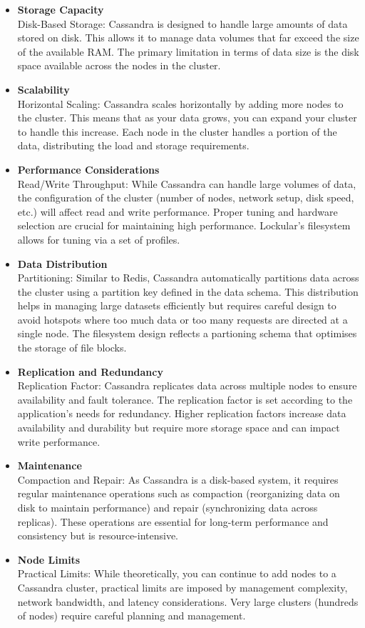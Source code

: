 \documentclass{tufte-handout}
\begin{document}
\begin{itemize}
  \item \textbf{Storage Capacity}\\
Disk-Based Storage: Cassandra is designed to handle large amounts of data stored on disk. This allows it to manage data volumes that far
exceed the size of the available RAM. The primary limitation in terms of data size is the disk space available across the nodes in the
cluster.
\item \textbf{Scalability}\\
Horizontal Scaling: Cassandra scales horizontally by adding more nodes to the cluster. This means that as your data grows, you can expand
your cluster to handle this increase. Each node in the cluster handles a portion of the data, distributing the load and storage requirements.
\item \textbf{Performance Considerations}\\
Read/Write Throughput: While Cassandra can handle large volumes of data, the configuration of the cluster (number of nodes, network setup,
disk speed, etc.) will affect read and write performance. Proper tuning and hardware selection are crucial for maintaining high performance.
Lockular's filesystem allows for tuning via a set of profiles.
\item \textbf{Data Distribution}\\
Partitioning: Similar to Redis, Cassandra automatically partitions data across the cluster using a partition key defined in the data schema. This distribution
helps in managing large datasets efficiently but requires careful design to avoid hotspots where too much data or too many requests are
directed at a single node. The filesystem design reflects a partioning schema that optimises the storage of file blocks.
\item \textbf{Replication and Redundancy}\\
Replication Factor: Cassandra replicates data across multiple nodes to ensure availability and fault tolerance. The replication factor
is set according to the application's needs for redundancy. Higher replication factors increase data availability and durability
but require more storage space and can impact write performance.
\item \textbf{Maintenance}\\
Compaction and Repair: As Cassandra is a disk-based system, it requires regular maintenance operations such as compaction (reorganizing
data on disk to maintain performance) and repair (synchronizing data across replicas). These operations are essential for long-term
performance and consistency but is resource-intensive.
\item \textbf{Node Limits}\\
Practical Limits: While theoretically, you can continue to add nodes to a Cassandra cluster, practical limits are imposed by management
complexity, network bandwidth, and latency considerations. Very large clusters (hundreds of nodes) require careful planning and management.
\end{itemize}
\end{document}
